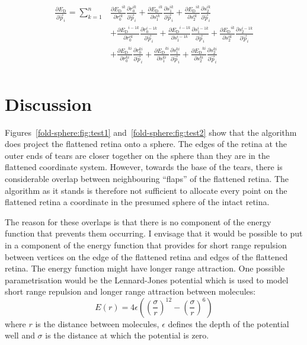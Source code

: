 \documentclass{article}
\newcommand{\ED}{\ensuremath{E_\mathrm{D}}\xspace}
\newcommand{\p}{\vec{p}}
\begin{document}
\begin{equation}
  \begin{split}
  \frac{\partial \ED}{\partial \p_i} = 
  \sum_{k=1}^n & 
  \frac{\partial \ED^{ik}}{\partial r_0^{ik}}
  \frac{\partial r_0^{ik}}{\partial \p_i} +
  \frac{\partial \ED^{ik}}{\partial s_1^{ik}}
  \frac{\partial s_1^{ik}}{\partial \p_i} +
  \frac{\partial \ED^{ik}}{\partial s_2^{ik}}
  \frac{\partial s_2^{ik}}{\partial \p_i} \\
  &   
  + \frac{\partial \ED^{i-1k}}{\partial r_0^{ik}}
  \frac{\partial r_0^{i-1k}}{\partial \p_i} +
  \frac{\partial \ED^{i-1k}}{\partial s_1^{i-1k}}
  \frac{\partial s_1^{i-1k}}{\partial \p_i} +
  \frac{\partial \ED^{ik}}{\partial s_2^{ik}}
  \frac{\partial s_2^{i-1k}}{\partial \p_i} \\
  & 
  + \frac{\partial \ED^{ki}}{\partial r_0^{ki}}
  \frac{\partial r_0^{ki}}{\partial \p_i} +
  \frac{\partial \ED^{ki}}{\partial s_1^{ki}}
  \frac{\partial s_1^{ki}}{\partial \p_i} +
  \frac{\partial \ED^{ki}}{\partial s_2^{ki}}
  \frac{\partial s_2^{ki}}{\partial \p_i} \\
  \end{split}
\end{equation}



\section{Discussion}
\label{fold-retina:sec:discussion}

Figures~\ref{fold-sphere:fig:test1} and~\ref{fold-sphere:fig:test2}
show that the algorithm does project the flattened retina onto a
sphere. The edges of the retina at the outer ends of tears are closer
together on the sphere than they are in the flattened coordinate
system. However, towards the base of the tears, there is considerable
overlap between neighbouring ``flaps'' of the flattened retina. The
algorithm as it stands is therefore not sufficient to allocate every
point on the flattened retina a coordinate in the presumed sphere of
the intact retina.

The reason for these overlaps is that there is no component of the
energy function that prevents them occurring. I envisage that it would
be possible to put in a component of the energy function that provides
for short range repulsion between vertices on the edge of the
flattened retina and edges of the flattened retina. The energy
function might have longer range attraction. One possible
parametrisation would be the Lennard-Jones potential which is used to
model short range repulsion and longer range attraction between
molecules:
\begin{equation}
  \label{fold-sphere:eq:4}
  E(r) = 4\epsilon\left(\left(\frac{\sigma}{r}\right)^{12}-
    \left(\frac{\sigma}{r}\right)^{6}\right)
\end{equation}
where $r$ is the distance between molecules, $\epsilon$ defines the
depth of the potential well and $\sigma$ is the distance at which the
potential is zero.
\end{document}
